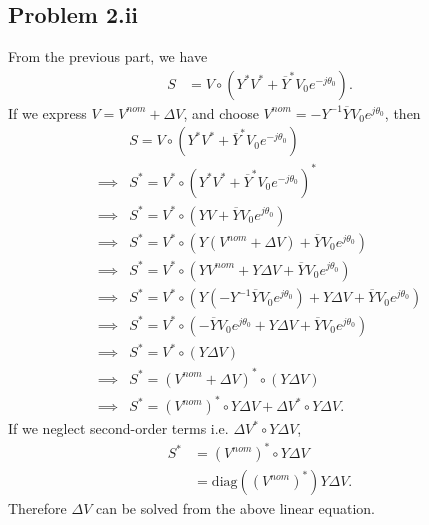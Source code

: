 \subsection*{Problem 2.ii}
From the previous part, we have
\begin{align*}
	S &= V \circ (Y^*V^* + \overline{Y}^*V_0e^{-j\theta_0}).
\end{align*}
If we express $V = V^{nom}+\Delta V$, and choose $V^{nom} = -Y^{-1}\overline{Y}V_0e^{j\theta_0}$, then
\begin{align*}
	&S = V \circ (Y^*V^* + \overline{Y}^*V_0e^{-j\theta_0})\\
	\implies & S^* = V^* \circ (Y^*V^* + \overline{Y}^*V_0e^{-j\theta_0})^*\\
	\implies & S^* = V^* \circ (YV + \overline{Y}V_0e^{j\theta_0})\\
	\implies & S^* = V^* \circ (Y(V^{nom}+\Delta V) + \overline{Y}V_0e^{j\theta_0})\\
	\implies & S^* = V^* \circ (YV^{nom} + Y\Delta V + \overline{Y}V_0e^{j\theta_0})\\
	\implies & S^* = V^* \circ (Y (-Y^{-1}\overline{Y}V_0e^{j\theta_0}) + Y \Delta V + \overline{Y}V_0e^{j\theta_0})\\
	\implies & S^* = V^* \circ (-\overline{Y}V_0e^{j\theta_0} + Y\Delta V + \overline{Y}V_0e^{j\theta_0})\\
	\implies & S^* = V^* \circ (Y \Delta V)\\
	\implies & S^* = (V^{nom}+\Delta V)^* \circ (Y \Delta V)\\
	\implies & S^* = (V^{nom})^* \circ Y \Delta V + \Delta V^* \circ  Y \Delta V.
\end{align*}
If we neglect second-order terms i.e. $\Delta V^* \circ  Y \Delta V$,
\begin{align*}
	S^* &= (V^{nom})^* \circ Y \Delta V \\
	&= \text{diag}((V^{nom})^*)Y \Delta V.
\end{align*}
Therefore $\Delta V$ can be solved from the above linear equation.
